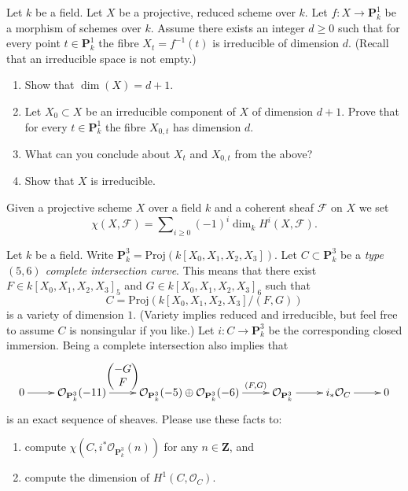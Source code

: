 \begin{exercise}
\label{exercise-irreducible-fibres-same-dimension-irreducible}
Let $k$ be a field.
Let $X$ be a projective, reduced scheme over $k$.
Let $f : X \to \mathbf{P}^1_k$ be a morphism of schemes over $k$.
Assume there exists an integer $d \geq 0$ such that
for every point $t \in \mathbf{P}^1_k$ the fibre $X_t = f^{-1}(t)$
is irreducible of dimension $d$. (Recall that an irreducible space is
not empty.)
\begin{enumerate}
\item Show that $\dim(X) = d + 1$.
\item Let $X_0 \subset X$ be an irreducible component of $X$ of dimension
$d + 1$. Prove that for every $t \in \mathbf{P}^1_k$ the fibre
$X_{0, t}$ has dimension $d$.
\item What can you conclude about $X_t$ and $X_{0, t}$ from the above?
\item Show that $X$ is irreducible.
\end{enumerate}
\end{exercise}

\begin{remark}
\label{remark-chi}
Given a projective scheme $X$ over a field $k$ and
a coherent sheaf $\mathcal{F}$ on $X$ we set
$$
\chi(X, \mathcal{F}) =
\sum\nolimits_{i \geq 0} (-1)^i\dim_k H^i(X, \mathcal{F}).
$$
\end{remark}

\begin{exercise}
\label{exercise-complete-intersection}
Let $k$ be a field.
Write $\mathbf{P}^3_k = \text{Proj}(k[X_0, X_1, X_2, X_3])$.
Let $C \subset \mathbf{P}^3_k$ be a
{\it type $(5,6)$ complete intersection curve}.
This means that there exist $F \in k[X_0, X_1, X_2, X_3]_5$ and
$G \in k[X_0, X_1, X_2, X_3]_6$ such that
$$
C = \text{Proj}(k[X_0, X_1, X_2, X_3]/(F, G))
$$
is a variety of dimension $1$. (Variety implies reduced and irreducible,
but feel free to assume $C$ is nonsingular if you like.)
Let $i : C \to \mathbf{P}^3_k$ be the corresponding closed immersion.
Being a complete intersection also implies that
$$
\xymatrix{
0 \ar[r] &
\mathcal{O}_{\mathbf{P}^3_k}(-11)
\ar[r]^-{
\left(
\begin{matrix}
-G \\
F
\end{matrix}
\right)
} &
\mathcal{O}_{\mathbf{P}^3_k}(-5) \oplus \mathcal{O}_{\mathbf{P}^3_k}(-6)
\ar[r]^-{(F, G)} &
\mathcal{O}_{\mathbf{P}^3_k} \ar[r] &
i_*\mathcal{O}_C \ar[r] &
0
}
$$
is an exact sequence of sheaves. Please use these facts to:
\begin{enumerate}
\item compute $\chi(C, i^*\mathcal{O}_{\mathbf{P}^3_k}(n))$ for
any $n \in \mathbf{Z}$, and
\item compute the dimension of $H^1(C, \mathcal{O}_C)$.
\end{enumerate}
\end{exercise}


